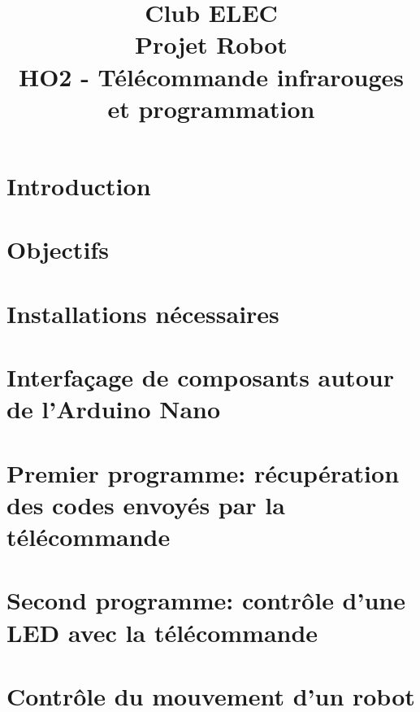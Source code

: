 \documentclass[a4paper,10pt,twoside]{article}
\title{
	\vspace{2.5cm}
	\normalfont \normalsize
	\huge Club ELEC\\
	\vspace{2.5cm}
	\huge Projet Robot\\
	\vspace{.25cm}
	\Large HO2 - Télécommande infrarouges et programmation
	\vspace{2.5cm}
	\centering
}
\begin{document}
\renewcommand{\figurename}{Fig.}
\renewcommand{\thepage}{\roman{page}}
\setcounter{page}{1}

\maketitle
\newpage
{}
\pagestyle{main}

\newpage
\null
\thispagestyle{empty}
\newpage
\clearpage

\setcounter{page}{1}

\section*{Introduction}


\section*{Objectifs}


\section*{Installations nécessaires}


\clearpage
\newpage
\section*{Interfaçage de composants autour de l'Arduino Nano}


\section*{Premier programme: récupération des codes envoyés par la télécommande}


\section*{Second programme: contrôle d'une LED avec la télécommande}


\section*{Contrôle du mouvement d'un robot}

\end{document}
